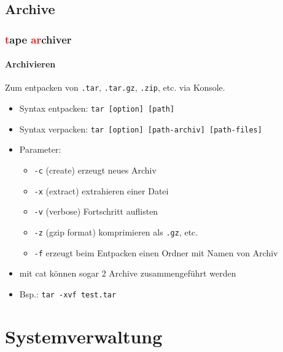 \documentclass[12pt,utf8]{beamer}
\begin{document}
\subsection{Archive}
\begin{frame}
\frametitle{\textcolor{red}{t}ape \textcolor{red}{ar}chiver}
\framesubtitle{\textcolor{ownDarkOr}{Archivieren}}
Zum entpacken von \texttt{.tar}, \texttt{.tar.gz}, \texttt{.zip}, etc. via Konsole.
\begin{itemize}
	\item Syntax entpacken: \texttt{tar [option] [path]}
	\item Syntax verpacken: \texttt{tar [option] [path-archiv] [path-files]}
	\item Parameter:
	\begin{itemize}[<+->]
		\item {\scriptsize \texttt{-c} (create) erzeugt neues Archiv}
		\item {\scriptsize \texttt{-x} (extract) extrahieren einer Datei}
		\item {\scriptsize \texttt{-v} (verbose) Fortschritt auflisten}
		\item {\scriptsize \texttt{-z} (gzip format) komprimieren als \texttt{.gz}, etc.}
		\item {\scriptsize \texttt{-f} erzeugt beim Entpacken einen Ordner mit Namen von Archiv}
	\end{itemize}
	\item {\scriptsize mit cat können sogar 2 Archive zusammengeführt werden}
	\item Bsp.: \texttt{tar -xvf test.tar}
\end{itemize}
\end{frame}

\section{Systemverwaltung}
\end{document}
